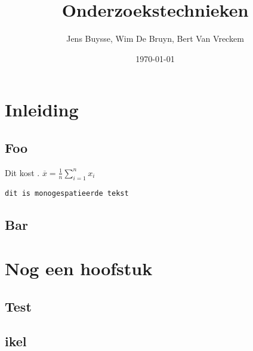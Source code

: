 \documentclass{hogent-report}
\title{Onderzoekstechnieken}
\author{Jens Buysse, Wim {De Bruyn}, Bert {Van Vreckem}}
\date{\today}
\begin{document}
  
  \usechapterimagefalse
  \tableofcontents
  
  \chapter{Inleiding}
  
  \lipsum[1]
  
  \section{Foo}
  
  Dit kost . $\overline{x} = \frac{1}{n} \sum_{i = 1}^{n} x_i$
  
  \texttt{dit is monogespatieerde tekst}
  
  \lipsum[2-3]
  
  \section{Bar}
  
  \lipsum[4-6]
  
  \chapter{Nog een hoofstuk}
  
  \lipsum[7]
  
  \section{Test}
  
  \lipsum[8-10]
  
  \section{ikel}
  
  \lipsum[11-15]
  
\end{document}
